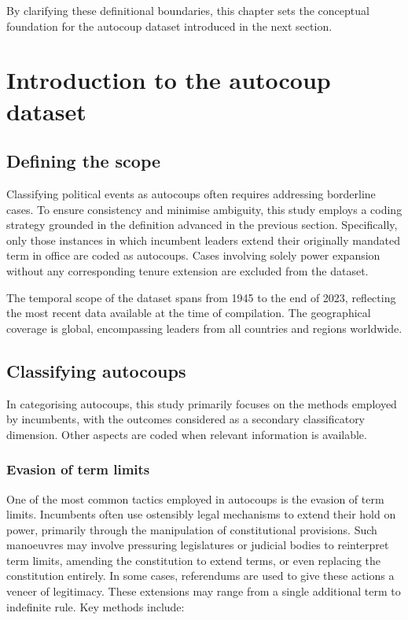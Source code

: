 \documentclass[
  12pt,
]{report}
\begin{document}
By clarifying these definitional boundaries, this chapter sets the
conceptual foundation for the autocoup dataset introduced in the next
section.

\section{Introduction to the autocoup
dataset}\label{introduction-to-the-autocoup-dataset}

\subsection*{Defining the scope}\label{defining-the-scope}

Classifying political events as autocoups often requires addressing
borderline cases. To ensure consistency and minimise ambiguity, this
study employs a coding strategy grounded in the definition advanced in
the previous section. Specifically, only those instances in which
incumbent leaders extend their originally mandated term in office are
coded as autocoups. Cases involving solely power expansion without any
corresponding tenure extension are excluded from the dataset.

The temporal scope of the dataset spans from 1945 to the end of 2023,
reflecting the most recent data available at the time of compilation.
The geographical coverage is global, encompassing leaders from all
countries and regions worldwide.

\subsection*{Classifying autocoups}\label{classifying-autocoups}

In categorising autocoups, this study primarily focuses on the methods
employed by incumbents, with the outcomes considered as a secondary
classificatory dimension. Other aspects are coded when relevant
information is available.

\subsubsection*{Evasion of term limits}\label{evasion-of-term-limits}

One of the most common tactics employed in autocoups is the evasion of
term limits. Incumbents often use ostensibly legal mechanisms to extend
their hold on power, primarily through the manipulation of
constitutional provisions. Such manoeuvres may involve pressuring
legislatures or judicial bodies to reinterpret term limits, amending the
constitution to extend terms, or even replacing the constitution
entirely. In some cases, referendums are used to give these actions a
veneer of legitimacy. These extensions may range from a single
additional term to indefinite rule. Key methods include:
\end{document}

